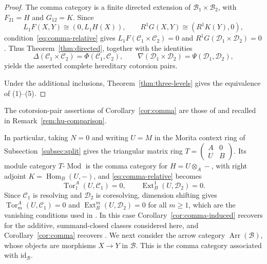 \documentclass[11pt]{amsart}
\theoremstyle{definition}
\theoremstyle{remark}
\theoremstyle{plain}
\numberwithin{equation}{section}
\begin{document}
\begin{proof}
	The comma category is a finite directed extension of $\mathcal{B}_1\times\mathcal{B}_2$, with $F_{21}=H$ and $G_{12}=K$. Since
	\[
	L_1F(X,Y)\cong(0,L_1H(X)),\qquad
	R^1G(X,Y)\cong(R^1K(Y),0),
	\]
	condition~\eqref{eq:comma-relative} gives
	$L_1F(\mathcal{C}_1\times\mathcal{C}_2)=0$ and
	$R^1G(\mathcal{D}_1\times\mathcal{D}_2)=0$.
	Thus Theorem~\ref{thm:directed}, together with the identities
	\[
	\Delta(\mathcal{C}_1\times\mathcal{C}_2)
	=\Phi(\mathcal{C}_1,\mathcal{C}_2),\qquad
	\nabla(\mathcal{D}_1\times\mathcal{D}_2)
	=\Psi(\mathcal{D}_1,\mathcal{D}_2),
	\]
	yields the asserted complete hereditary cotorsion pairs.
	
	Under the additional inclusions, 
	Theorem~\ref{thm:three-levels} gives the equivalence of \textup{(1)--(5)}.
\end{proof}

The cotorsion-pair assertions of Corollary~\ref{cor:comma} are those of
\cite{HuZhuComma} and \cite{YuanHeWu} recalled in
Remark~\ref{rem:hu-comparison}.

In particular, taking $N = 0$ and writing $U = M$ in the Morita context ring
of Subsection~\ref{subsec:split} gives the triangular matrix ring
$T = \left(\begin{smallmatrix}A & 0\\ U & B\end{smallmatrix}\right)$. Its
module category $T\text{-}\operatorname{Mod}$ is the comma category for $H = U \otimes_A-$, with
right adjoint $K = \operatorname{Hom}_B(U, -)$, and \eqref{eq:comma-relative} becomes
\begin{equation}\label{eq:triangular-relative}
 \operatorname{Tor}^A_1(U, \mathcal{C}_1) = 0, \qquad \operatorname{Ext}^1_B(U, \mathcal{D}_2) = 0.
\end{equation}
Since $\mathcal{C}_1$ is resolving and $\mathcal{D}_2$ is coresolving, dimension shifting
gives $\operatorname{Tor}_m^A(U, \mathcal{C}_1) = 0$ and $\operatorname{Ext}_B^m(U, \mathcal{D}_2) = 0$ for all $m \geq 1$, which
are the vanishing conditions used in \cite{Mao}. In this case
Corollary~\ref{cor:comma-induced} recovers \cite[Theorem~2.2]{Mao} for the
additive, summand-closed classes considered here, and
Corollary~\ref{cor:comma} recovers \cite[Theorem~2.5]{Mao}.
We next consider the arrow category
$\operatorname{Arr}(\mathcal{B})$, whose objects are morphisms $X\to Y$ in $\mathcal{B}$. This is the comma category associated with
$\mathrm{id}_{\mathcal{B}}$.
\end{document}
